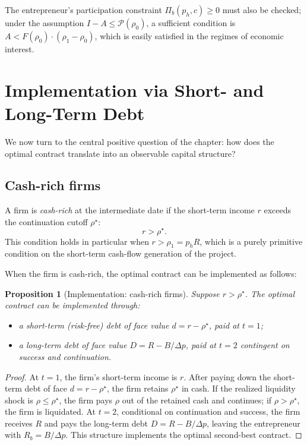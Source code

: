 \documentclass[11pt,a4paper,oneside]{book}
\def\leq{\leqslant}
\def\geq{\geqslant}
\theoremstyle{plain}
\newtheorem{proposition}[theorem]{Proposition}
\theoremstyle{definition}
\theoremstyle{remark}
\numberwithin{equation}{chapter}
\begin{document}
The entrepreneur's participation constraint $\Pi_b(p_h, c) \geq 0$ must also be checked; under the assumption $I - A \leq \mathcal{P}(\rho_0)$, a sufficient condition is $A < F(\rho_0) \cdot (\rho_1 - \rho_0)$, which is easily satisfied in the regimes of economic interest.

\section{Implementation via Short- and Long-Term Debt}
\label{sec:ML-implementation}

We now turn to the central positive question of the chapter: how does the optimal contract translate into an observable capital structure?

\subsection{Cash-rich firms}

A firm is \emph{cash-rich} at the intermediate date if the short-term income $r$ exceeds the continuation cutoff $\rho^\star$:
\begin{equation*}
  r > \rho^\star.
\end{equation*}
This condition holds in particular when $r > \rho_1 = p_h R$, which is a purely primitive condition on the short-term cash-flow generation of the project.

When the firm is cash-rich, the optimal contract can be implemented as follows:

\begin{proposition}[Implementation: cash-rich firms]\label{prop:ML-implementation-cash-rich}
Suppose $r > \rho^\star$.
The optimal contract can be implemented through:
\begin{itemize}
  \item a \emph{short-term (risk-free) debt} of face value $d = r - \rho^\star$, paid at $t=1$;
  \item a \emph{long-term debt} of face value $D = R - B/\Delta p$, paid at $t=2$ contingent on success and continuation.
\end{itemize}
\end{proposition}

\begin{proof}
At $t=1$, the firm's short-term income is $r$.
After paying down the short-term debt of face $d = r - \rho^\star$, the firm retains $\rho^\star$ in cash.
If the realized liquidity shock is $\rho \leq \rho^\star$, the firm pays $\rho$ out of the retained cash and continues; if $\rho > \rho^\star$, the firm is liquidated.
At $t=2$, conditional on continuation and success, the firm receives $R$ and pays the long-term debt $D = R - B/\Delta p$, leaving the entrepreneur with $R_b = B/\Delta p$.
This structure implements the optimal second-best contract.
\end{proof}
\end{document}
